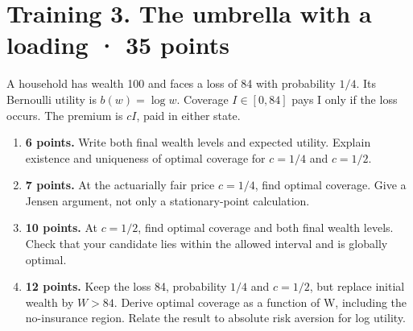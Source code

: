 \section*{Training 3. The umbrella with a loading · 35 points}
A household has wealth 100 and faces a loss of 84 with probability $1/4$.
Its Bernoulli utility is $b(w)=\log w$. Coverage $I\in[0,84]$ pays I only
if the loss occurs. The premium is $cI$, paid in either state.
\begin{enumerate}[label=(\alph*)]
\item \textbf{6 points.} Write both final wealth levels and expected utility.
Explain existence and uniqueness of optimal coverage for $c=1/4$ and $c=1/2$.
\item \textbf{7 points.} At the actuarially fair price $c=1/4$, find optimal
coverage. Give a Jensen argument, not only a stationary-point calculation.
\item \textbf{10 points.} At $c=1/2$, find optimal coverage and both final
wealth levels. Check that your candidate lies within the allowed interval
and is globally optimal.
\item \textbf{12 points.} Keep the loss 84, probability $1/4$ and $c=1/2$,
but replace initial wealth by $W>84$. Derive optimal coverage as a function
of W, including the no-insurance region. Relate the result to absolute risk
aversion for log utility.
\end{enumerate}
